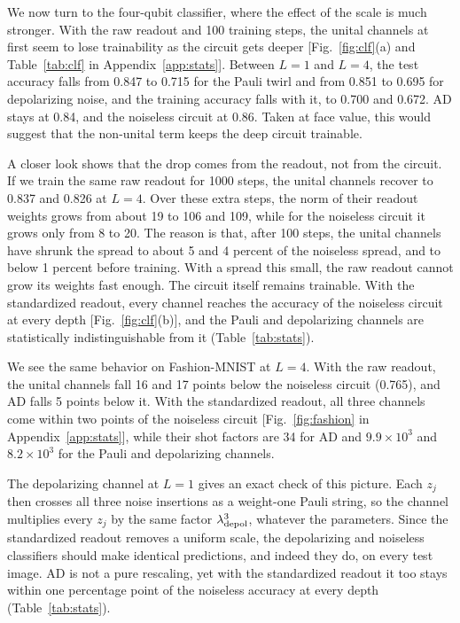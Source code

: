 \documentclass[
 aps,pra,
 twocolumn,
 superscriptaddress,
 longbibliography,
 nofootinbib
]{revtex4-2}
\begin{document}
We now turn to the four-qubit classifier, where the effect of the scale is much
stronger. With the raw readout and 100 training steps, the unital channels at
first seem to lose trainability as the circuit gets deeper
[Fig.~\ref{fig:clf}(a) and Table~\ref{tab:clf} in Appendix~\ref{app:stats}]. Between $L=1$ and $L=4$, the test
accuracy falls from 0.847 to 0.715 for the Pauli twirl and from 0.851 to 0.695
for depolarizing noise, and the training accuracy falls with it, to 0.700 and
0.672. AD stays at 0.84, and the noiseless circuit at 0.86. Taken at face
value, this would suggest that the non-unital term keeps the deep circuit
trainable.

A closer look shows that the drop comes from the readout, not from the
circuit. If we train the same raw readout for 1000 steps, the unital channels
recover to 0.837 and 0.826 at $L=4$. Over these extra steps, the norm of their
readout weights grows from about 19 to 106 and 109, while for the noiseless
circuit it grows only from 8 to 20. The reason is that, after 100 steps, the
unital channels have shrunk the spread to about 5 and 4 percent of the
noiseless spread, and to below 1 percent before training. With a spread this
small, the raw readout cannot grow its weights fast enough. The circuit itself
remains trainable. With the standardized readout, every channel reaches the
accuracy of the noiseless circuit at every depth [Fig.~\ref{fig:clf}(b)], and
the Pauli and depolarizing channels are statistically indistinguishable from it
(Table~\ref{tab:stats}).

We see the same behavior on Fashion-MNIST at $L=4$. With the raw readout, the
unital channels fall 16 and 17 points below the noiseless circuit (0.765), and
AD falls 5 points below it. With the standardized readout, all three channels
come within two points of the noiseless circuit [Fig.~\ref{fig:fashion} in
Appendix~\ref{app:stats}],
while their shot factors are 34 for AD and $9.9\times10^3$ and
$8.2\times10^3$ for the Pauli and depolarizing channels.

The depolarizing channel at $L=1$ gives an exact check of this picture. Each
$z_j$ then crosses all three noise insertions as a weight-one Pauli string,
so the channel multiplies every $z_j$ by the same factor
$\lambda_{\rm depol}^3$, whatever the parameters. Since the standardized
readout removes a uniform scale, the depolarizing and noiseless classifiers
should make identical predictions, and indeed they do, on every test image. AD
is not a pure rescaling, yet with the standardized readout it too stays within
one percentage point of the noiseless accuracy at every depth
(Table~\ref{tab:stats}).
\end{document}
